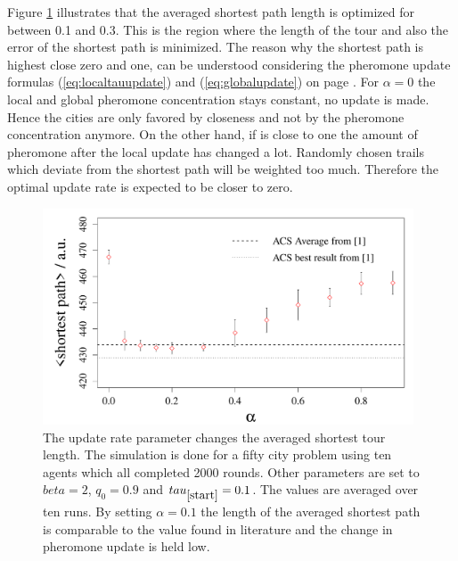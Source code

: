 Figure \ref{fig:alphasp} illustrates that the averaged shortest path length is optimized for \alpha between 0.1 and 0.3. This is the region where the length of the tour and also the error of the shortest path is minimized. The reason why the shortest path is highest close zero and one, can be understood considering the pheromone update formulas (\ref{eq:localtauupdate}) and (\ref{eq:globalupdate}) on page \pageref{sec:model}. For $\alpha=0$ the local and global pheromone concentration stays constant, no update is made. Hence the cities are only favored by closeness and not by the pheromone concentration anymore. On the other hand, if \alpha is close to one the amount of pheromone after the local update has changed a lot. Randomly chosen trails which deviate from the shortest path will be weighted too much. Therefore the optimal update rate \alpha is expected to be closer to zero. 
\begin{figure}[h!]
\begin{center}
\includegraphics[width=11cm, height= 6 cm]{alpha_vs_shortestpath}
\caption{The update rate parameter \alpha changes the averaged shortest tour length. The simulation is done for a fifty city problem using ten agents which all completed 2000 rounds. Other parameters are set to $beta=2$, $q_0=0.9$ and $tau_{\ref{start}}=0.1$. The values are averaged over ten runs. By setting $\alpha=0.1$ the length of the averaged shortest path is comparable to the value found in literature \cite{paper} and the change in pheromone update is held low.}
\label{fig:alphasp}
\end{center}
\end{figure}

